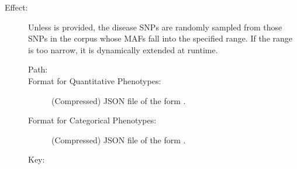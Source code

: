 \documentclass[a4paper,10pt,english]{sphinxhowto}
\begin{document}
\begin{description}
\begin{description}
\begin{description}
\item[{Effect:}] \leavevmode
Unless  is provided, the disease SNPs are randomly sampled from those SNPs in the corpus whose MAFs
fall into the specified range. If the range is too narrow, it is dynamically extended at runtime.

\end{description}

\end{description}

\item[{\sphinxstylestrong{Output:}}] \leavevmode\begin{description}
\item[{}] \leavevmode\begin{description}
\item[{Path:}] \leavevmode
{}

\item[{Format for Quantitative Phenotypes:}] \leavevmode
(Compressed) JSON file of the form .

\item[{Format for Categorical Phenotypes:}] \leavevmode
(Compressed) JSON file of the form .

\end{description}

\item[{}] \leavevmode\begin{description}
\item[{Key:}] \leavevmode
{}


\end{description}
\end{description}
\end{description}
\end{document}
